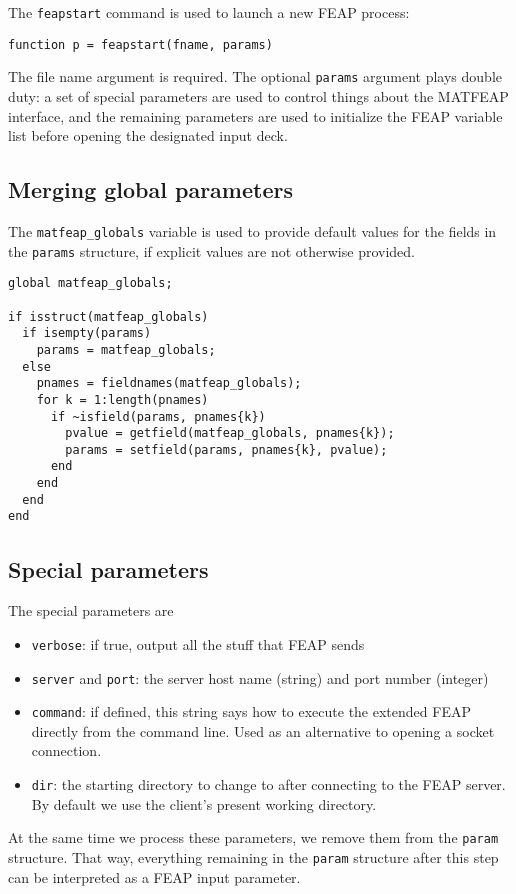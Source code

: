 The {\tt feapstart} command is used to launch a new FEAP process:
\begin{verbatim}
function p = feapstart(fname, params)
\end{verbatim}

The file name argument is required.  The optional {\tt params}
argument plays double duty: a set of special parameters are used
to control things about the MATFEAP interface, and the remaining
parameters are used to initialize the FEAP variable list before
opening the designated input deck.
\subsection{Merging global parameters}

The {\tt matfeap\_globals} variable is used to provide default
values for the fields in the {\tt params} structure, if explicit
values are not otherwise provided.

\begin{verbatim}
global matfeap_globals;

if isstruct(matfeap_globals)
  if isempty(params)
    params = matfeap_globals;
  else
    pnames = fieldnames(matfeap_globals);
    for k = 1:length(pnames)
      if ~isfield(params, pnames{k})
        pvalue = getfield(matfeap_globals, pnames{k});
        params = setfield(params, pnames{k}, pvalue);
      end
    end
  end
end

\end{verbatim}
\subsection{Special parameters}

The special parameters are
\begin{itemize}
\item {\tt verbose}: if true, output all the stuff that FEAP sends
\item {\tt server} and {\tt port}: the server host name
(string) and port number (integer)
\item {\tt command}: if defined, this string says how to
execute the extended FEAP directly from the command line.
Used as an alternative to opening a socket connection.
\item {\tt dir}: the starting directory to change to after
connecting to the FEAP server.  By default we use the
client's present working directory.
\end{itemize}

At the same time we process these parameters, we remove them
from the {\tt param} structure.  That way, everything remaining
in the {\tt param} structure after this step can be interpreted
as a FEAP input parameter.

